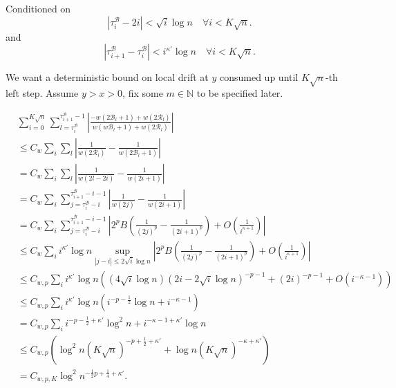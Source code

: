 
Conditioned on 
\[
	\left| \tau_i^{\mathcal{B}} - 2 i \right| < \sqrt{ i} \log n \quad \forall i < K \sqrt{n} 
.\] 
and
\[
	\left| \tau_{i+1}^{\mathcal{B}} - \tau_i^{\mathcal{B}} \right| < i^{\kappa'} \log n \quad \forall i < K \sqrt{n} 
.\] 

We want a deterministic bound on local drift at $y$ consumed up until $K\sqrt{n}$-th left step. Assume $y > x > 0$, fix some $m \in \mathbb{N}$ to be specified later.

\begin{align*}
	&\sum_{i = 0}^{K \sqrt{n} } 
	\sum_{l = \tau_i^{\mathcal{B}}} ^{\tau_{i+1}^{\mathcal{B}}  -1}
	\left|\frac{-w(2 \mathcal{B}_l + 1) + w(2 \mathcal{R}_l)}{w(w\mathcal{B}_l + 1) + w(2 \mathcal{R}_l)}\right|\\
	&\le C_w \sum_i \sum_l \left| \frac{1}{w(2 \mathcal{R}_l)} - \frac{1}{w(2 \mathcal{B}_l + 1)} \right|  \\
	&= C_w \sum_i \sum_l \left| \frac{1}{w(2 l - 2 i)} - \frac{1}{w(2i + 1)} \right|  \\
	&= C_w \sum_i \sum_{j = \tau_i^{\mathcal{B}} - i}^{\tau_{i+1}^{\mathcal{B}} - i - 1} \left| \frac{1}{w(2j)} - \frac{1}{w(2i + 1)} \right|  \\
	&= C_w \sum_i \sum_{j = \tau_i^{\mathcal{B}} - i}^{\tau_{i+1}^{\mathcal{B}} - i - 1} \left|  2^p B\left( \frac{1}{(2j)^p} - \frac{1}{(2i + 1)^p} \right)  + O\left( \frac{1}{i^{\kappa + 1}} \right) \right|  \\
	&\le C_w \sum_i i^{\kappa'}\log n \sup_{|j - i| \le 2 \sqrt{i}  \log n} \left|  2^p B\left( \frac{1}{(2j)^p} - \frac{1}{(2i + 1)^p} \right)  + O\left( \frac{1}{i^{\kappa + 1}} \right) \right| \\
	&\le C_{w, p} \sum_i i^{\kappa'} \log n \left( 
		(4 \sqrt{ i } \log n) (2 i - 2 \sqrt{ i } \log n)^{- p - 1} + (2 i)^{- p - 1} + O(i^{- \kappa - 1})
	\right)  \\
	&\le  C_{w, p} \sum_i i^{\kappa'} \log n \left( i ^{-p - \frac{1}{2}} \log n +  i^{- \kappa - 1} \right)  \\
	&= C_{w, p} \sum_i i^{- p - \frac{1}{2} + \kappa'} \log^2 n + i^{- \kappa - 1 + \kappa'} \log n \\
	&\le C_{w, p} \left( \log^2 n (K \sqrt{ n} )^{-p+ \frac{1}{2} + \kappa'} + \log n (K \sqrt{ n} )^{- \kappa + \kappa'} \right)  \\
	&= C_{w, p, K} \log^2 n^{-\frac{1}{2}p + \frac{1}{4} + \kappa'} 
.\end{align*} 

